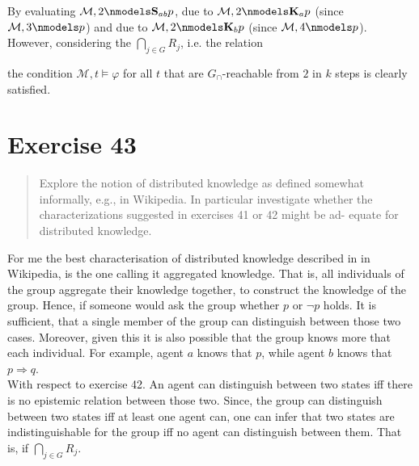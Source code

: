 \documentclass[11pt,a4paper]{article}
\newcommand{\eall}{\mathbf{K}}
\newcommand{\edisp}{\mathbf{S}}
\newcommand{\sto}{\Rightarrow}
\begin{document}
By evaluating $\mathcal{M},2 \nmodels \edisp_{ab} p$, due to $\mathcal{M},2 \nmodels \eall_a p$ (since $\mathcal{M},3 \nmodels p$) and due to $\mathcal{M},2 \nmodels \eall_b p$ (since $\mathcal{M},4 \nmodels p$). However, considering the $\bigcap_{j \in G} R_j$, i.e. the relation

\begin{center}
\end{center}

the condition $\mathcal{M},t \models \varphi$ for all $t$ that are $G_{\cap}$-reachable from $2$ in $k$ steps is clearly satisfied.


\section*{Exercise 43}
\begin{quote}
Explore the notion of distributed knowledge as defined somewhat informally, e.g., in Wikipedia. In particular investigate whether the characterizations suggested in exercises 41 or 42 might be ad- equate for distributed knowledge.
\end{quote}

For me the best characterisation of distributed knowledge described in in Wikipedia, is the one calling it aggregated knowledge. That is, all individuals of the group aggregate their knowledge together, to construct the knowledge of the group. Hence, if someone would ask the group whether $p$ or $\neg p$ holds. It is sufficient, that a single member of the group can distinguish between those two cases. Moreover, given this it is also possible that the group knows more that each individual. For example, agent $a$ knows that $p$, while agent $b$ knows that $p \sto q$. \\

With respect to exercise 42. An agent can distinguish between two states iff there is no epistemic relation between those two. Since, the group can distinguish between two states iff at least one agent can, one can infer that two states are indistinguishable for the group iff no agent can distinguish between them. That is, if $ \bigcap_{j \in G} R_j$. 
\end{document}
